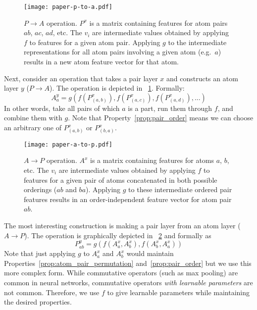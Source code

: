 \begin{figure}[tb]
\centering
  \texttt{[image: paper-p-to-a.pdf]}
  \caption{$P \rightarrow A$ operation. $P^x$ is a matrix containing features
  for atom pairs $ab$, $ac$, $ad$, etc. The $v_i$ are intermediate values
  obtained by applying $f$ to features for a given atom pair. Applying $g$ to
  the intermediate representations for all atom pairs involving a given atom
  (e.g.~$a$) results in a new atom feature vector for that atom.}
  \label{fig:p-to-a}
\end{figure}

Next, consider an operation that takes a pair layer $x$ and constructs an atom
layer $y$ ($P \rightarrow A$). The operation is depicted in
\figurename~\ref{fig:p-to-a}. Formally:
\begin{equation}
    A^y_a = g(f(P^x_{(a,b)}), f(P^x_{(a,c)}), f(P^x_{(a,d)}), ...)
\end{equation}
In other words, take all pairs of which $a$ is a part, run them through $f$, and
combine them with $g$. Note that Property~\ref{prop:pair_order} means we can
choose an arbitrary one of $P^x_{(a,b)}$ or $P^x_{(b,a)}$.

\begin{figure}[tb]
\centering
  \texttt{[image: paper-a-to-p.pdf]}
  \caption{$A \rightarrow P$ operation. $A^x$ is a matrix containing features
  for atoms $a$, $b$, etc. The $v_i$ are intermediate values obtained by
  applying $f$ to features for a given pair of atoms concatenated in both
  possible orderings ($ab$ and $ba$). Applying $g$ to these intermediate ordered
  pair features results in an order-independent feature vector for atom pair
  $ab$.}
  \label{fig:a-to-p}
\end{figure}
The most interesting construction is making a pair layer from an atom
layer ($A \rightarrow P$). The operation is graphically depicted in
\figurename~\ref{fig:a-to-p} and formally as
\begin{equation}
    P^y_{ab} = g(f(A^x_a, A^x_b), f(A^x_b, A^x_a))
\end{equation}
Note that just applying $g$ to $A^x_a$ and $A^x_b$ would maintain
Properties~\ref{prop:atom_pair_permutation} and~\ref{prop:pair_order} but we use
this more complex form. While commutative operators (such as max pooling) are
common in neural networks, commutative operators \emph{with learnable
parameters} are not common. Therefore, we use $f$ to give learnable parameters
while maintaining the desired properties.

